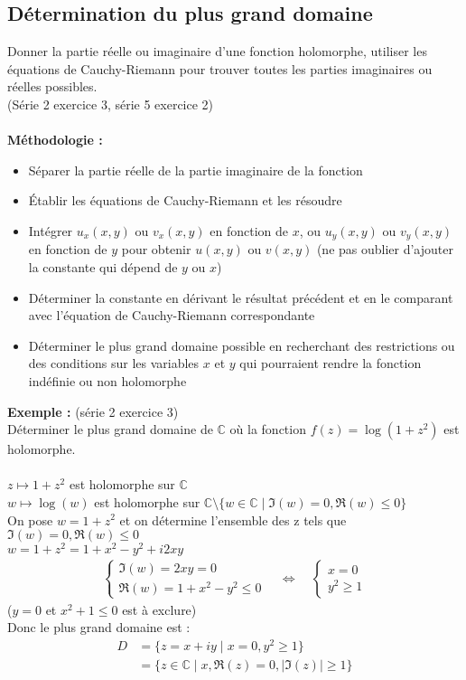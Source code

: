 \subsection{Détermination du plus grand domaine}
Donner la partie réelle ou imaginaire d’une fonction holomorphe, utiliser les équations de Cauchy-Riemann pour trouver toutes les parties imaginaires ou réelles possibles. \\
(Série 2 exercice 3, série 5 exercice 2) \\
\\
\textbf{Méthodologie :}
\begin{itemize}
    \item Séparer la partie réelle de la partie imaginaire de la fonction
    \item Établir les équations de Cauchy-Riemann et les résoudre 
    \item Intégrer $u_x(x,y)$ ou $v_x(x,y)$ en fonction de $x$, ou $u_y(x,y)$ ou $v_y(x,y)$ en fonction de $y$ pour obtenir $u(x,y)$ ou $v(x,y)$ (ne pas oublier d'ajouter la constante qui dépend de $y$ ou $x$)
    \item Déterminer la constante en dérivant le résultat précédent et en le comparant avec l'équation de Cauchy-Riemann correspondante
    \item Déterminer le plus grand domaine possible en recherchant des restrictions ou des conditions sur les variables $x$ et $y$ qui pourraient rendre la fonction indéfinie ou non holomorphe
\end{itemize}
\textbf{Exemple : }(série 2 exercice 3) \\
Déterminer le plus grand domaine de $\mathbb{C}$ où la fonction $f(z) = \log(1+z^2)$ est holomorphe. \\
\\
$z \mapsto 1+z^2$ est holomorphe sur $\mathbb{C}$ \\
$w \mapsto \log(w)$ est holomorphe sur $\mathbb{C} \setminus \{w \in \mathbb{C} \mid \Im(w) = 0, \Re(w) \leq 0\}$ \\
On pose $w = 1+z^2$ et on détermine l'ensemble des z tels que $\Im(w) = 0, \Re(w) \leq 0$ \\
$w = 1+z^2 = 1 + x^2 -y^2 + i2xy$
\begin{align*}
    \begin{cases}
        \Im(w) = 2xy = 0 \\
        \Re(w) = 1 + x^2 -y^2 \leq 0
    \end{cases}
    \quad
    \Leftrightarrow
    \quad
    \begin{cases}
        x = 0 \\
        y^2 \geq 1
    \end{cases}
\end{align*}
($y=0$ et $x^2+1 \leq 0$ est à exclure) \\
Donc le plus grand domaine est :
\begin{align*}
    D &= \{z = x+iy \mid x = 0, y^2 \geq 1\} \\
    &= \{z \in \mathbb{C} \mid x, \Re(z) = 0, |\Im(z)| \geq 1\}
\end{align*}